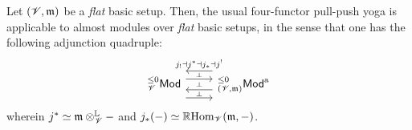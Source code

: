                     \begin{theorem} \label{theorem: four_functors_for_almost_modules}
                        Let $(\mathscr{V}, \mathfrak{m})$ be a \textit{flat} basic setup. Then, the usual four-functor pull-push yoga is applicable to almost modules over \textit{flat} basic setups, in the sense that one has the following adjunction quadruple:
                            $$
                                \begin{tikzcd}
                                	{{}_{\scrV}^{\leq 0}\Mod} & {{}_{(\scrV, \m)}^{\leq 0}\Mod^{\almost}}
                                	\arrow[""{name=0, anchor=center, inner sep=0}, "{j_! \ladjoint j^* \ladjoint j_* \ladjoint j^!}"', shift right=5, from=1-2, to=1-1]
                                	\arrow[""{name=1, anchor=center, inner sep=0}, shift right=5, from=1-1, to=1-2]
                                	\arrow[""{name=2, anchor=center, inner sep=0}, shift left=2, from=1-2, to=1-1]
                                	\arrow[""{name=3, anchor=center, inner sep=0}, shift left=2, from=1-1, to=1-2]
                                	\arrow["\dashv"{anchor=center, rotate=-90}, draw=none, from=0, to=3]
                                	\arrow["\dashv"{anchor=center, rotate=-90}, draw=none, from=3, to=2]
                                	\arrow["\dashv"{anchor=center, rotate=-90}, draw=none, from=2, to=1]
                                \end{tikzcd}
                            $$
                        wherein $j^* \cong \m \tensor_{\scrV}^{\L} -$ and $j_*(-) \simeq \mathbb{R}\mathrm{Hom}_{\mathscr{V}}(\mathfrak{m}, -)$.
                    \end{theorem}
